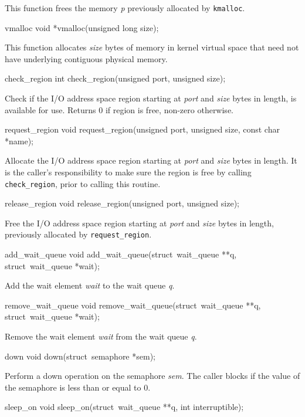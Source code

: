 \begin{icsymlist}
This function frees the memory \emph{p} previously allocated by
{\tt kmalloc}.

\item[vmalloc]
\funcproto void *vmalloc(unsigned long size);

This function allocates \emph{size} bytes of memory in kernel
virtual space that need not have underlying contiguous physical memory.

\item[check_region]
\funcproto int check_region(unsigned port, unsigned size);

Check if the I/O address space region starting at \emph{port} and
\emph{size} bytes in length, is available for use.  Returns 0 if region is
free, non-zero otherwise.

\item[request_region]
\funcproto void request_region(unsigned port, unsigned size,
				const char *name);

Allocate the I/O address space region starting at \emph{port} and
\emph{size} bytes in length.  It is the caller's responsibility to
make sure the region is free by calling {\tt check_region}, prior
to calling this routine.

\item[release_region]
\funcproto void release_region(unsigned port, unsigned size);

Free the I/O address space region starting at \emph{port} and
\emph{size} bytes in length, previously allocated by {\tt request_region}.

\item[add_wait_queue]
\funcproto void add_wait_queue(struct~wait_queue **q, struct~wait_queue *wait);

Add the wait element \emph{wait} to the wait queue \emph{q}.

\item[remove_wait_queue]
\funcproto void remove_wait_queue(struct~wait_queue **q,
				  struct~wait_queue *wait);

Remove the wait element \emph{wait} from the wait queue \emph{q}.

\item[down]
\funcproto void down(struct~semaphore *sem);

Perform a down operation on the semaphore \emph{sem}.  The caller blocks if
the value of the semaphore is less than or equal to 0.

\item[sleep_on]
\funcproto void sleep_on(struct~wait_queue **q, int interruptible);


\end{icsymlist}
